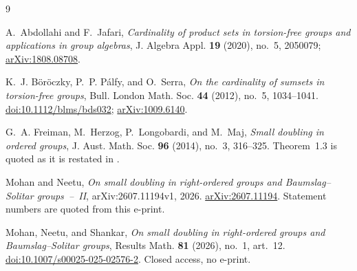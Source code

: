 \documentclass[11pt]{amsart}
\theoremstyle{remark}
\begin{document}
\begin{thebibliography}{9}

A.~Abdollahi and F.~Jafari,
\emph{Cardinality of product sets in torsion-free groups and applications in
group algebras},
J. Algebra Appl. \textbf{19} (2020), no.~5, 2050079;
\href{https://arxiv.org/abs/1808.08708}{arXiv:1808.08708}.

K.~J. B\"or\"oczky, P.~P. P\'alfy, and O.~Serra,
\emph{On the cardinality of sumsets in torsion-free groups},
Bull. London Math. Soc. \textbf{44} (2012), no.~5, 1034--1041.
\href{https://doi.org/10.1112/blms/bds032}{doi:10.1112/blms/bds032};
\href{https://arxiv.org/abs/1009.6140}{arXiv:1009.6140}.

G.~A. Freiman, M.~Herzog, P.~Longobardi, and M.~Maj,
\emph{Small doubling in ordered groups},
J. Aust. Math. Soc. \textbf{96} (2014), no.~3, 316--325.
Theorem~1.3 is quoted as it is restated in \cite[Theorem~2.3]{MN}.

Mohan and Neetu,
\emph{On small doubling in right-ordered groups and Baumslag--Solitar groups~--~II},
arXiv:2607.11194v1, 2026.
\href{https://arxiv.org/abs/2607.11194}{arXiv:2607.11194}.
Statement numbers are quoted from this e-print.

Mohan, Neetu, and Shankar,
\emph{On small doubling in right-ordered groups and Baumslag--Solitar groups},
Results Math. \textbf{81} (2026), no.~1, art.~12.
\href{https://doi.org/10.1007/s00025-025-02576-2}{doi:10.1007/s00025-025-02576-2}.
Closed access, no e-print.

\end{thebibliography}
\end{document}
